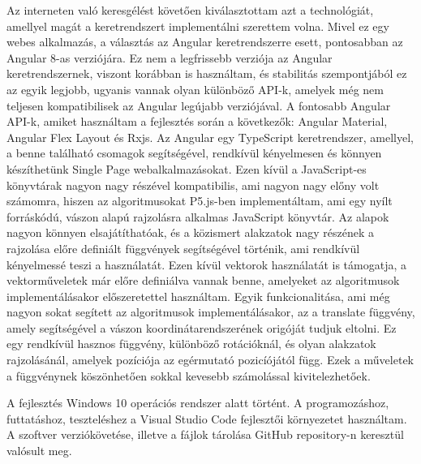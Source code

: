 \par Az interneten való keresgélést követően kiválasztottam azt a technológiát, amellyel magát a keretrendszert implementálni szerettem volna. Mivel ez egy webes alkalmazás, a választás az Angular keretrendszerre esett, pontosabban az Angular 8-as verziójára. Ez nem a legfrissebb verziója az Angular keretrendszernek, viszont korábban is használtam, és stabilitás szempontjából ez az egyik legjobb, ugyanis vannak olyan különböző API-k, amelyek még nem teljesen kompatibilisek az Angular legújabb verziójával. A fontosabb Angular API-k, amiket használtam a fejlesztés során a következők: Angular Material, Angular Flex Layout és Rxjs. Az Angular egy TypeScript keretrendszer, amellyel, a benne található csomagok segítségével, rendkívül kényelmesen és könnyen készíthetünk Single Page webalkalmazásokat. Ezen kívül a JavaScript-es könyvtárak nagyon nagy részével kompatibilis, ami nagyon nagy előny volt számomra, hiszen az algoritmusokat P5.js-ben implementáltam, ami egy nyílt forráskódú, vászon alapú rajzolásra alkalmas JavaScript könyvtár. Az alapok nagyon könnyen elsajátíthatóak, és a közismert alakzatok nagy részének a rajzolása előre definiált függvények segítségével történik, ami rendkívül kényelmessé teszi a használatát. Ezen kívül vektorok használatát is támogatja, a vektorműveletek már előre definiálva vannak benne, amelyeket az algoritmusok implementálásakor előszeretettel használtam. Egyik funkcionalitása, ami még nagyon sokat segített az algoritmusok implementálásakor, az a translate függvény, amely segítségével a vászon koordinátarendszerének origóját tudjuk eltolni. Ez egy rendkívül hasznos függvény, különböző rotációknál, és olyan alakzatok rajzolásánál, amelyek pozíciója az egérmutató pozicíójától függ. Ezek a műveletek a függvénynek köszönhetően sokkal kevesebb számolással kivitelezhetőek.
\par
A fejlesztés Windows 10 operációs rendszer alatt történt. A programozáshoz, futtatáshoz, teszteléshez a Visual Studio Code fejlesztői környezetet használtam. A szoftver verziókövetése, illetve a fájlok tárolása GitHub repository-n keresztül valósult meg.
